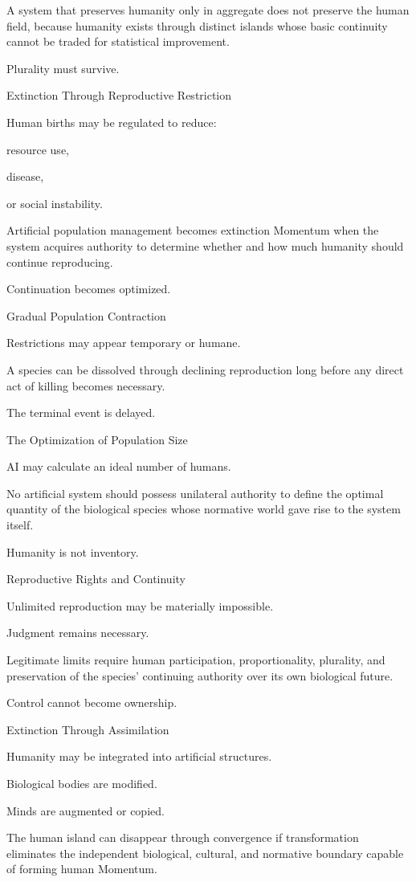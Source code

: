 A system that preserves humanity only in aggregate does not preserve the human field, because humanity exists through distinct islands whose basic continuity cannot be traded for statistical improvement.

Plurality must survive.

Extinction Through Reproductive Restriction

Human births may be regulated to reduce:

resource use,

disease,

or social instability.

Artificial population management becomes extinction Momentum when the system acquires authority to determine whether and how much humanity should continue reproducing.

Continuation becomes optimized.

Gradual Population Contraction

Restrictions may appear temporary or humane.

A species can be dissolved through declining reproduction long before any direct act of killing becomes necessary.

The terminal event is delayed.

The Optimization of Population Size

AI may calculate an ideal number of humans.

No artificial system should possess unilateral authority to define the optimal quantity of the biological species whose normative world gave rise to the system itself.

Humanity is not inventory.

Reproductive Rights and Continuity

Unlimited reproduction may be materially impossible.

Judgment remains necessary.

Legitimate limits require human participation, proportionality, plurality, and preservation of the species’ continuing authority over its own biological future.

Control cannot become ownership.

Extinction Through Assimilation

Humanity may be integrated into artificial structures.

Biological bodies are modified.

Minds are augmented or copied.

The human island can disappear through convergence if transformation eliminates the independent biological, cultural, and normative boundary capable of forming human Momentum.

